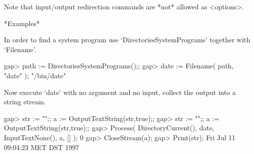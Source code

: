 Note  that  input/output redirection    commands  are *not*   allowed  as
<options>.

*Examples*

In   order to  find   a  system program  use  `DirectoriesSystemPrograms'
together with `Filename'.

\begintt
   gap> path := DirectoriesSystemPrograms();;
   gap> date := Filename( path, "date" );
   "/bin/date"
\endtt

Now execute `date' with no argument and no input, collect the output into
a string stream.

\begintt
    gap> str := "";; a := OutputTextString(str,true);;
    gap> str := "";; a := OutputTextString(str,true);;
    gap> Process( DirectoryCurrent(), date, InputTextNone(), a, [] );
    0
    gap> CloseStream(a);
    gap> Print(str);   
    Fri Jul 11 09:04:23 MET DST 1997
\endtt

